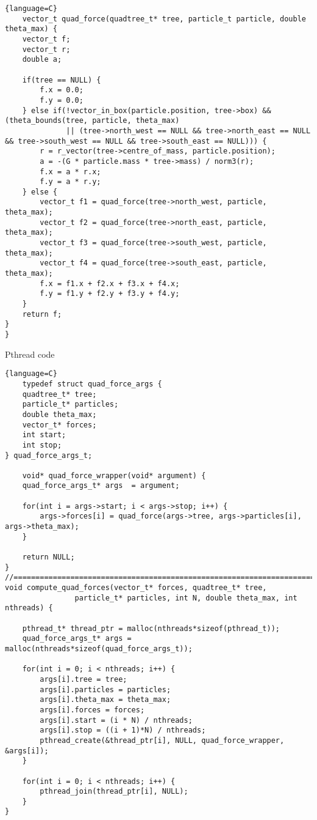 \begin{lstlisting}{language=C}
    vector_t quad_force(quadtree_t* tree, particle_t particle, double theta_max) {
    vector_t f;
    vector_t r;
    double a;

    if(tree == NULL) {
        f.x = 0.0;
        f.y = 0.0;
    } else if(!vector_in_box(particle.position, tree->box) && (theta_bounds(tree, particle, theta_max)
              || (tree->north_west == NULL && tree->north_east == NULL && tree->south_west == NULL && tree->south_east == NULL))) {
        r = r_vector(tree->centre_of_mass, particle.position);
        a = -(G * particle.mass * tree->mass) / norm3(r);
        f.x = a * r.x;
        f.y = a * r.y;
    } else {
        vector_t f1 = quad_force(tree->north_west, particle, theta_max);
        vector_t f2 = quad_force(tree->north_east, particle, theta_max);
        vector_t f3 = quad_force(tree->south_west, particle, theta_max);
        vector_t f4 = quad_force(tree->south_east, particle, theta_max);
        f.x = f1.x + f2.x + f3.x + f4.x;
        f.y = f1.y + f2.y + f3.y + f4.y;
    }
    return f;
}
}
\end{lstlisting}
\newpage
\begin{center}
    Pthread code
\end{center}
\begin{lstlisting}{language=C}
    typedef struct quad_force_args {
    quadtree_t* tree;
    particle_t* particles;
    double theta_max;
    vector_t* forces;
    int start;
    int stop;
} quad_force_args_t;

    void* quad_force_wrapper(void* argument) {
    quad_force_args_t* args  = argument;

    for(int i = args->start; i < args->stop; i++) {
        args->forces[i] = quad_force(args->tree, args->particles[i], args->theta_max);
    }

    return NULL;
}
//==========================================================================
void compute_quad_forces(vector_t* forces, quadtree_t* tree,
                particle_t* particles, int N, double theta_max, int nthreads) {

    pthread_t* thread_ptr = malloc(nthreads*sizeof(pthread_t));
    quad_force_args_t* args = malloc(nthreads*sizeof(quad_force_args_t));

    for(int i = 0; i < nthreads; i++) {
        args[i].tree = tree;
        args[i].particles = particles;
        args[i].theta_max = theta_max;
        args[i].forces = forces;
        args[i].start = (i * N) / nthreads;
        args[i].stop = ((i + 1)*N) / nthreads;
        pthread_create(&thread_ptr[i], NULL, quad_force_wrapper, &args[i]);
    }

    for(int i = 0; i < nthreads; i++) {
        pthread_join(thread_ptr[i], NULL);
    }
}
\end{lstlisting}

